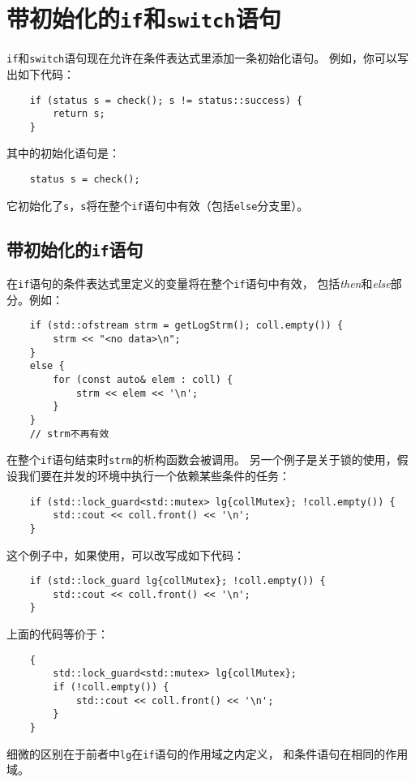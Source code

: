 \section{带初始化的\texttt{if}和\texttt{switch}语句}\label{ch2}
\texttt{if}和\texttt{switch}语句现在允许在条件表达式里添加一条初始化语句。
例如，你可以写出如下代码：
\begin{lstlisting}
    if (status s = check(); s != status::success) {
        return s;
    }
\end{lstlisting}
其中的初始化语句是：
\begin{lstlisting}
    status s = check();
\end{lstlisting}
它初始化了\texttt{s}，\texttt{s}将在整个\texttt{if}语句中有效（包括\texttt{else}分支里）。

\subsection{带初始化的\texttt{if}语句}
在\texttt{if}语句的条件表达式里定义的变量将在整个\texttt{if}语句中有效，
包括\emph{then}和\emph{else}部分。例如：
\begin{lstlisting}
    if (std::ofstream strm = getLogStrm(); coll.empty()) {
        strm << "<no data>\n";
    }
    else {
        for (const auto& elem : coll) {
            strm << elem << '\n';
        }
    }
    // strm不再有效
\end{lstlisting}
在整个\texttt{if}语句结束时\texttt{strm}的析构函数会被调用。
另一个例子是关于锁的使用，假设我们要在并发的环境中执行一个依赖某些条件的任务：
\begin{lstlisting}
    if (std::lock_guard<std::mutex> lg{collMutex}; !coll.empty()) {
        std::cout << coll.front() << '\n';
    }
\end{lstlisting}
这个例子中，如果使用，可以改写成如下代码：
\begin{lstlisting}
    if (std::lock_guard lg{collMutex}; !coll.empty()) {
        std::cout << coll.front() << '\n';
    }
\end{lstlisting}
上面的代码等价于：
\begin{lstlisting}
    {
        std::lock_guard<std::mutex> lg{collMutex};
        if (!coll.empty()) {
            std::cout << coll.front() << '\n';
        }
    }
\end{lstlisting}
细微的区别在于前者中\texttt{lg}在\texttt{if}语句的作用域之内定义，
和条件语句在相同的作用域。

